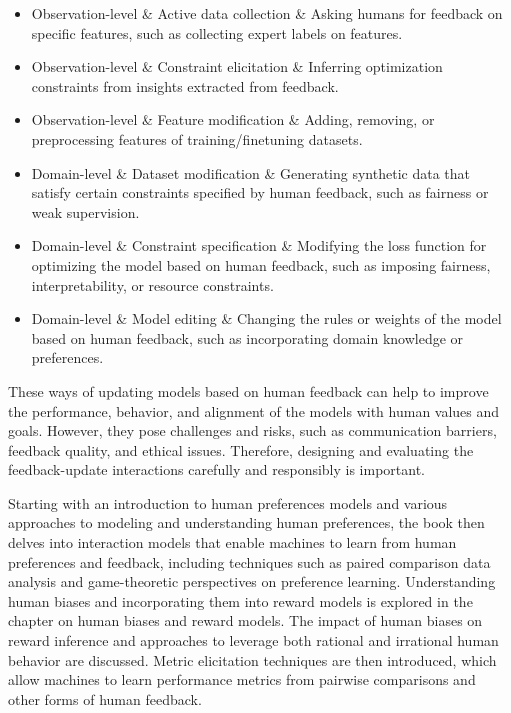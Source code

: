 \documentclass[
  letterpaper,
  DIV=11,
  numbers=noendperiod,
  oneside]{scrreprt}
\theoremstyle{remark}
\begin{document}
\begin{itemize}
\item
  Observation-level \& Active data collection \& Asking humans for
  feedback on specific features, such as collecting expert labels on
  features.
\item
  Observation-level \& Constraint elicitation \& Inferring optimization
  constraints from insights extracted from feedback.
\item
  Observation-level \& Feature modification \& Adding, removing, or
  preprocessing features of training/finetuning datasets.
\item
  Domain-level \& Dataset modification \& Generating synthetic data that
  satisfy certain constraints specified by human feedback, such as
  fairness or weak supervision.
\item
  Domain-level \& Constraint specification \& Modifying the loss
  function for optimizing the model based on human feedback, such as
  imposing fairness, interpretability, or resource constraints.
\item
  Domain-level \& Model editing \& Changing the rules or weights of the
  model based on human feedback, such as incorporating domain knowledge
  or preferences.
\end{itemize}

These ways of updating models based on human feedback can help to
improve the performance, behavior, and alignment of the models with
human values and goals. However, they pose challenges and risks, such as
communication barriers, feedback quality, and ethical issues. Therefore,
designing and evaluating the feedback-update interactions carefully and
responsibly is important.

Starting with an introduction to human preferences models and various
approaches to modeling and understanding human preferences, the book
then delves into interaction models that enable machines to learn from
human preferences and feedback, including techniques such as paired
comparison data analysis and game-theoretic perspectives on preference
learning. Understanding human biases and incorporating them into reward
models is explored in the chapter on human biases and reward models. The
impact of human biases on reward inference and approaches to leverage
both rational and irrational human behavior are discussed. Metric
elicitation techniques are then introduced, which allow machines to
learn performance metrics from pairwise comparisons and other forms of
human feedback.
\end{document}
